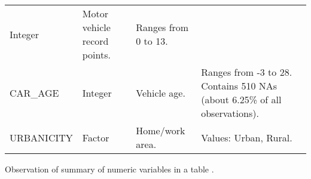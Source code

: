 \documentclass[]{article}
\begin{document}
\begin{longtable}[]{@{}llll@{}}
\begin{minipage}[t]{0.12\columnwidth}
Integer\strut
\end{minipage} & \begin{minipage}[t]{0.28\columnwidth}\raggedright\strut
Motor vehicle record points.\strut
\end{minipage} & \begin{minipage}[t]{0.28\columnwidth}\raggedright\strut
Ranges from 0 to 13.\strut
\end{minipage}\tabularnewline
\begin{minipage}[t]{0.16\columnwidth}\raggedright\strut
CAR\_AGE\strut
\end{minipage} & \begin{minipage}[t]{0.12\columnwidth}\raggedright\strut
Integer\strut
\end{minipage} & \begin{minipage}[t]{0.28\columnwidth}\raggedright\strut
Vehicle age.\strut
\end{minipage} & \begin{minipage}[t]{0.28\columnwidth}\raggedright\strut
Ranges from -3 to 28. Contains 510 NAs (about 6.25\% of all
observations).\strut
\end{minipage}\tabularnewline
\begin{minipage}[t]{0.16\columnwidth}\raggedright\strut
URBANICITY\strut
\end{minipage} & \begin{minipage}[t]{0.12\columnwidth}\raggedright\strut
Factor\strut
\end{minipage} & \begin{minipage}[t]{0.28\columnwidth}\raggedright\strut
Home/work area.\strut
\end{minipage} & \begin{minipage}[t]{0.28\columnwidth}\raggedright\strut
Values: Urban, Rural.\strut
\end{minipage}\tabularnewline
\bottomrule
\end{longtable}

Observation of summary of numeric variables in a table .
\end{document}
